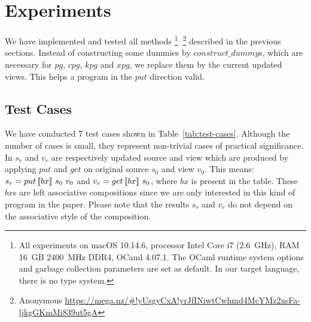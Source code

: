 \section{Experiments} \label{sect:experiments}

We have implemented and tested all methods%
%
\footnote{All experiments on macOS 10.14.6, processor Intel Core i7 (2.6~GHz), RAM 16~GB 2400~MHz DDR4, OCaml 4.07.1. The OCaml runtime system options and garbage collection parameters are set as default. In our target language, there is no type system.}$^,$%
%
\footnote{Anonymous \url{https://mega.nz/\#!yUsgyCxA!yrJfINiwtCwhmd4McYMz2xsFa-ljkgGKmMi839ut5gA}}
%
described in the previous sections.
Instead of constructing some dummies by $construct\_dummy$s, which are necessary for $pg$, $cpg$, $kpg$ and $xpg$, we replace them by the current updated views. This helps a program in the $put$ direction valid.

\subsection{Test Cases}

We have conducted 7 test cases shown in Table~\ref{tab:test-cases}. Although the number of cases is small, 
they represent non-trivial cases of practical significance.
In $s_r$ and $v_r$ are respectively updated source and view which are produced by applying $put$ and $get$ on original source $s_0$ and view $v_0$. This means: $s_r = put \, [\![bx]\!] \ s_0 \ v_0$ and $v_r = get \, [\![bx]\!] \ s_0$, where $bx$ is present in the table. These $bx$s are left associative compositions since we are only interested in this kind of program in the paper. Please note that the results $s_r$ and $v_r$ do not depend on the associative style of the composition.

